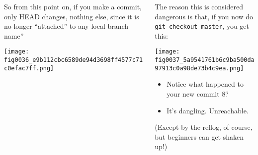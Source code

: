 \documentclass[presentation]{beamer}
\begin{document}
\begin{frame}

\tiny
\begin{columns}
\begin{column}{0.5\textwidth}
\label{sec-10-4-1}


So from this point on, if you make a commit, only HEAD changes, nothing else,
since it is no longer ``attached'' to any local branch name''


\texttt{[image: fig0036\_e9b112cbc6589de94d3698ff4577c71c0efac7ff.png]}
\end{column}
\begin{column}{0.5\textwidth}
\label{sec-10-4-2}


The reason this is considered dangerous is that, if you now do \texttt{git checkout master}, you get this:


\texttt{[image: fig0037\_5a9541761b6c9ba500da97913c0a98de73b4c9ea.png]}



\begin{itemize}
\item Notice what happened to your new commit 8?
\item It's dangling.  Unreachable.
\end{itemize}
(Except by the reflog, of course, but beginners can get shaken up!)
\end{column}
\end{columns}
\end{frame}
\end{document}
